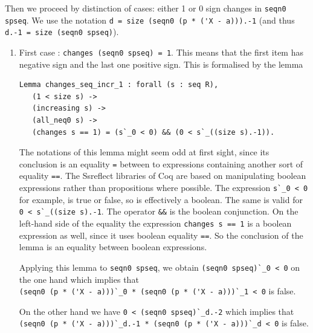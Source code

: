 \documentclass[11pt, a4paper]{article}
\begin{document}
Then we proceed by distinction of cases: either 1 or 0 sign changes in \lstinline!seqn0 spseq!.
 We use the notation \lstinline!d = size (seqn0 (p * ('X - a))).-1! (and thus \lstinline!d.-1 = size (seqn0 spseq)!).
\begin{enumerate}
 \item First case : \lstinline!changes (seqn0 spseq) = 1!. This means that the first item has negative sign and the last one positive sign.
This is formalised by the lemma
\begin{lstlisting}
Lemma changes_seq_incr_1 : forall (s : seq R),
   (1 < size s) ->
   (increasing s) ->
   (all_neq0 s) ->
   (changes s == 1) = (s`_0 < 0) && (0 < s`_((size s).-1)).
\end{lstlisting}
The notations of this lemma might seem odd at first sight, since its conclusion is an equality \lstinline!=! between to expressions containing another sort of equality \lstinline!==!. The Ssreflect libraries of Coq are based on manipulating boolean expressions rather than propositions where possible. The expression \lstinline!s`_0 < 0! for example, is true or false, so is effectively a boolean. The same is valid for \lstinline!0 < s`_((size s).-1!. The operator \lstinline!&&! is the boolean conjunction. On the left-hand side of the equality the expression \lstinline!changes s == 1! is a boolean expression as well, since it uses boolean equality \lstinline!==!. So the conclusion of the lemma is an equality between boolean expressions.

Applying this lemma to \lstinline!seqn0 spseq!, we obtain \lstinline!(seqn0 spseq)`_0 < 0! on the one hand %
which implies that \\ \lstinline!(seqn0 (p * ('X - a)))`_0 * (seqn0 (p * ('X - a)))`_1 < 0! is false.

On the other hand we have
\lstinline!0 < (seqn0 spseq)`_d.-2!
which implies that 
\lstinline!(seqn0 (p * ('X - a)))`_d.-1 * (seqn0 (p * ('X - a)))`_d < 0!
is false.


\end{enumerate}
\end{document}
